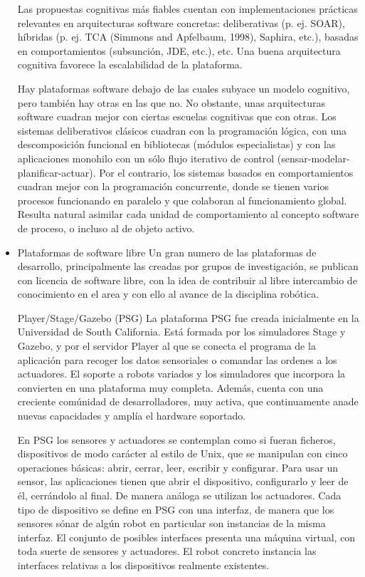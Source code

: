 \begin{itemize}
	Las propuestas cognitivas más fiables cuentan con implementaciones prácticas relevantes en arquitecturas software concretas: deliberativas (p. ej. SOAR), híbridas (p. ej. TCA (Simmons and Apfelbaum, 1998), Saphira, etc.), basadas en comportamientos (subsunción, JDE, etc.), etc. Una buena arquitectura cognitiva favorece la escalabilidad de la plataforma.

	Hay plataformas software debajo de las cuales subyace un modelo cognitivo, pero también hay otras en las que no. No obstante, unas arquitecturas software cuadran mejor con ciertas escuelas cognitivas que con otras. Los sistemas deliberativos clásicos cuadran con la programación lógica, con una descomposición funcional en bibliotecas (módulos especialistas) y con las aplicaciones monohilo con un sólo flujo iterativo de control (sensar-modelar-planificar-actuar). Por el contrario, los sistemas basados en comportamientos cuadran mejor con la programación concurrente, donde se tienen varios procesos funcionando en paralelo y que colaboran al funcionamiento global. Resulta natural asimilar cada unidad de comportamiento al concepto software de proceso, o incluso al de objeto activo.

	\item Plataformas de software libre
	Un gran numero de las plataformas de desarrollo, principalmente las creadas por grupos de investigación, se publican con licencia de software libre, con la idea de contribuir al libre intercambio de conocimiento en el area y con ello al avance de la disciplina robótica.

	Player/Stage/Gazebo (PSG) La plataforma PSG fue creada inicialmente en la Universidad de South California. Está formada por los simuladores Stage y Gazebo, y por el servidor Player al que se conecta el programa de la aplicación para recoger los datos sensoriales o comandar las ordenes a los actuadores. El soporte a robots variados y los simuladores que incorpora la convierten en una plataforma muy completa. Además, cuenta con una creciente comúnidad de desarrolladores, muy activa, que continuamente anade nuevas capacidades y amplía el hardware soportado.

	En PSG los sensores y actuadores se contemplan como si fueran ficheros, dispositivos de modo carácter al estilo de Unix, que se manipulan con cinco operaciones básicas: abrir, cerrar, leer, escribir y configurar. Para usar un sensor, las aplicaciones tienen que abrir el dispositivo, configurarlo y leer de él, cerrándolo al final. De manera análoga se utilizan los actuadores. Cada tipo de dispositivo se define en PSG con una interfaz, de manera que los sensores sónar de algún robot en particular son instancias de la misma interfaz. El conjunto de posibles interfaces presenta una máquina virtual, con toda suerte de sensores y actuadores. El robot concreto instancia las interfaces relativas a los dispositivos realmente existentes.


\end{itemize}
